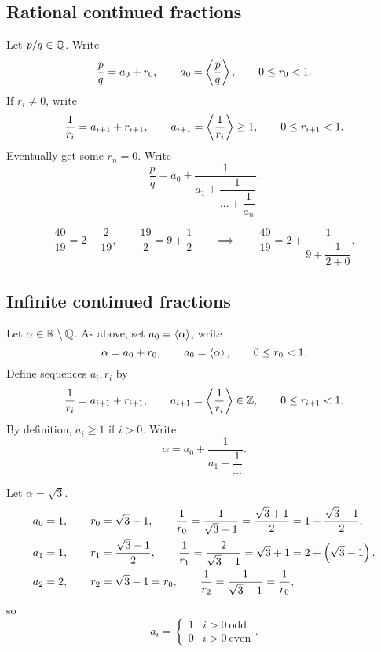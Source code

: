 \subsection{Rational continued fractions}

Let $ p / q \in \mathbb{Q} $. Write
$$ \dfrac{p}{q} = a_0 + r_0, \qquad a_0 = \left\langle \dfrac{p}{q} \right\rangle, \qquad 0 \le r_0 < 1. $$
If $ r_i \ne 0 $, write
$$ \dfrac{1}{r_i} = a_{i + 1} + r_{i + 1}, \qquad a_{i + 1} = \left\langle \dfrac{1}{r_i} \right\rangle \ge 1, \qquad 0 \le r_{i + 1} < 1. $$
Eventually get some $ r_n = 0 $. Write
$$ \dfrac{p}{q} = a_0 + \dfrac{1}{a_1 + \dfrac{1}{\dots + \dfrac{1}{a_n}}}. $$

\begin{example2}
$$ \dfrac{40}{19} = 2 + \dfrac{2}{19}, \qquad \dfrac{19}{2} = 9 + \dfrac{1}{2} \qquad \implies \qquad \dfrac{40}{19} = 2 + \dfrac{1}{9 + \dfrac{1}{2 + 0}}. $$
\end{example2}

\subsection{Infinite continued fractions}

Let $ \alpha \in \mathbb{R} \setminus \mathbb{Q} $. As above, set $ a_0 = \left\langle \alpha \right\rangle $, write
$$ \alpha = a_0 + r_0, \qquad a_0 = \left\langle \alpha \right\rangle, \qquad 0 \le r_0 < 1. $$
Define sequences $ a_i, r_i $ by
$$ \dfrac{1}{r_i} = a_{i + 1} + r_{i + 1}, \qquad a_{i + 1} = \left\langle \dfrac{1}{r_i} \right\rangle \in \mathbb{Z}, \qquad 0 \le r_{i + 1} < 1. $$
By definition, $ a_i \ge 1 $ if $ i > 0 $. Write
$$ \alpha = a_0 + \dfrac{1}{a_1 + \dfrac{1}{\dots}}. $$

\begin{example2}
Let $ \alpha = \sqrt{3} $.
\begin{align*}
& a_0 = 1, \qquad r_0 = \sqrt{3} - 1, \qquad \dfrac{1}{r_0} = \dfrac{1}{\sqrt{3} - 1} = \dfrac{\sqrt{3} + 1}{2} = 1 + \dfrac{\sqrt{3} - 1}{2}. \\
& a_1 = 1, \qquad r_1 = \dfrac{\sqrt{3} - 1}{2}, \qquad \dfrac{1}{r_1} = \dfrac{2}{\sqrt{3} - 1} = \sqrt{3} + 1 = 2 + \left( \sqrt{3} - 1 \right). \\
& a_2 = 2, \qquad r_2 = \sqrt{3} - 1 = r_0, \qquad \dfrac{1}{r_2} = \dfrac{1}{\sqrt{3} - 1} = \dfrac{1}{r_0},
\end{align*}
so
$$ a_i =
\begin{cases}
1 & i > 0 \ \text{odd} \\
0 & i > 0 \ \text{even}
\end{cases}.
$$
\end{example2}

